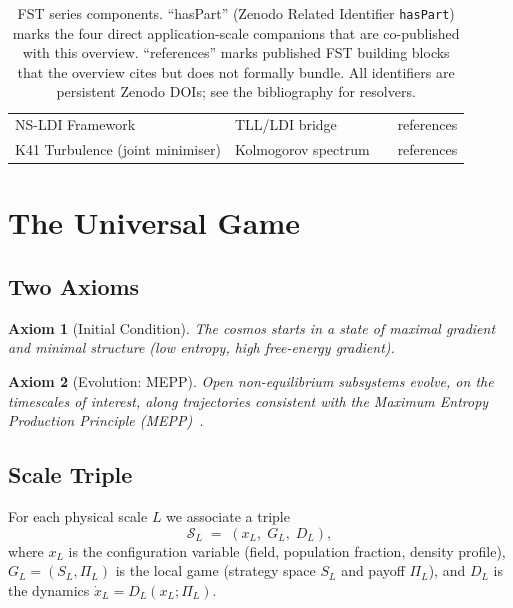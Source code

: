 \documentclass[11pt,a4paper]{article}
\newtheorem{axiom}{Axiom}
\theoremstyle{remark}
\begin{document}
\begin{table}[h]
\begin{tabular}{lllc}
NS-LDI Framework                & TLL/LDI bridge          & \cite{GeigerNSLDI-2026}      & references \\
K41 Turbulence (joint minimiser)& Kolmogorov spectrum     & \cite{GeigerK41-2026}        & references \\
\bottomrule
\end{tabular}
\caption{FST series components. ``hasPart'' (Zenodo Related Identifier
\texttt{hasPart}) marks the four direct application-scale companions
that are co-published with this overview. ``references'' marks
published FST building blocks that the overview cites but does not
formally bundle. All identifiers are persistent Zenodo DOIs; see the
bibliography for resolvers.}
\label{tab:series-components}
\end{table}

\section{The Universal Game}
\label{sec:universal-game}

\subsection{Two Axioms}

\begin{axiom}[Initial Condition]
The cosmos starts in a state of maximal gradient and minimal structure
(low entropy, high free-energy gradient).
\end{axiom}

\begin{axiom}[Evolution: MEPP]
Open non-equilibrium subsystems evolve, on the timescales of interest,
along trajectories consistent with the Maximum Entropy Production
Principle (MEPP)~\cite{MartyushevSeleznev2006}.
\end{axiom}

\subsection{Scale Triple}

For each physical scale $L$ we associate a triple
\[
\mathcal{S}_L \;=\; (x_L,\; G_L,\; D_L),
\]
where $x_L$ is the configuration variable (field, population fraction,
density profile), $G_L = (S_L, \Pi_L)$ is the local game
(strategy space $S_L$ and payoff $\Pi_L$), and $D_L$ is the dynamics
$\dot{x}_L = D_L(x_L; \Pi_L)$.
\end{document}
